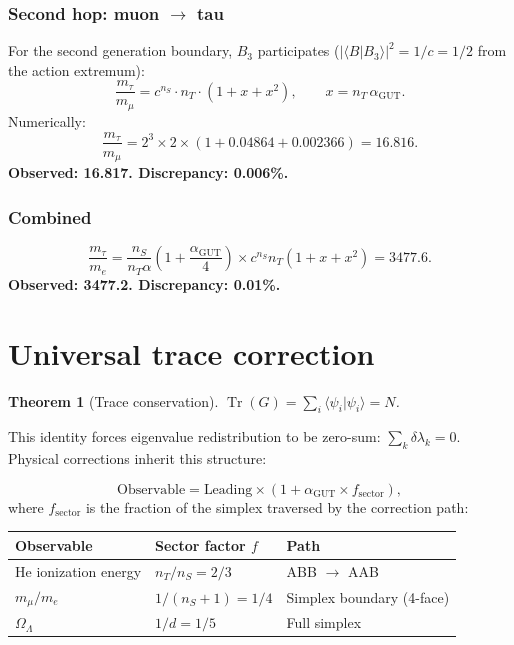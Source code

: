 \documentclass[12pt,a4paper]{article}
\newtheorem{theorem}{Theorem}[section]
\newcommand{\tr}{\operatorname{Tr}}
\newcommand{\agut}{\alpha_{\mathrm{GUT}}}
\newcommand{\nS}{n_S}
\newcommand{\nT}{n_T}
\begin{document}
\subsubsection{Second hop: muon $\to$ tau}

For the second generation boundary, $B_3$ participates
($|\langle B|B_3\rangle|^2 = 1/c = 1/2$ from the action extremum):
\begin{equation}
\frac{m_\tau}{m_\mu} = c^{\nS}\cdot\nT
\cdot\left(1 + x + x^2\right),
\qquad x = \nT\,\agut.
\end{equation}
Numerically:
\begin{equation}
\frac{m_\tau}{m_\mu}
= 2^3 \times 2 \times (1 + 0.04864 + 0.002366)
= 16.816.
\end{equation}
\textbf{Observed: 16.817.  Discrepancy: 0.006\%.}

\subsubsection{Combined}

\begin{equation}
\boxed{\frac{m_\tau}{m_e}
= \frac{\nS}{\nT\alpha}\left(1+\frac{\agut}{4}\right)
\times c^{\nS}\nT\left(1+x+x^2\right)
= 3477.6.}
\end{equation}
\textbf{Observed: 3477.2.  Discrepancy: 0.01\%.}

\section{Universal trace correction}
\label{sec:trace}

\begin{theorem}[Trace conservation]
$\tr(G) = \sum_i \langle\psi_i|\psi_i\rangle = N$.
\end{theorem}

This identity forces eigenvalue redistribution to be
zero-sum: $\sum_k \delta\lambda_k = 0$.
Physical corrections inherit this structure:

\begin{equation}
\label{eq:universal}
\text{Observable} = \text{Leading}
\times \left(1 + \agut \times f_{\mathrm{sector}}\right),
\end{equation}
where $f_{\mathrm{sector}}$ is the fraction of the simplex
traversed by the correction path:

\begin{center}
\begin{tabular}{lll}
\toprule
Observable & Sector factor $f$ & Path \\
\midrule
He ionization energy & $\nT/\nS = 2/3$ & ABB $\to$ AAB \\
$m_\mu/m_e$ & $1/(\nS+1) = 1/4$ & Simplex boundary (4-face) \\
$\Omega_\Lambda$ & $1/d = 1/5$ & Full simplex \\
\bottomrule
\end{tabular}
\end{center}
\end{document}
